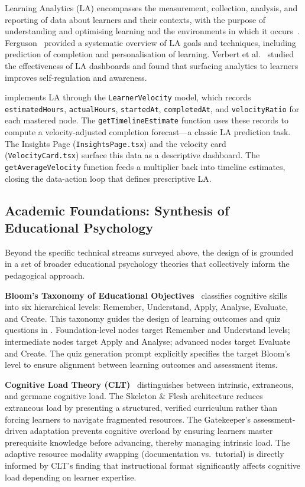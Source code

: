 Learning Analytics (LA) encompasses the measurement, collection, analysis, and reporting of data about learners and their contexts, with the purpose of understanding and optimising learning and the environments in which it occurs~\cite{siemens2011}. Ferguson~\cite{ferguson2012} provided a systematic overview of LA goals and techniques, including prediction of completion and personalisation of learning. Verbert et al.~\cite{verbert2012} studied the effectiveness of LA dashboards and found that surfacing analytics to learners improves self-regulation and awareness.

\projectname{} implements LA through the \texttt{LearnerVelocity} model, which records \texttt{estimatedHours}, \texttt{actualHours}, \texttt{startedAt}, \texttt{completedAt}, and \texttt{velocityRatio} for each mastered node. The \texttt{getTimelineEstimate} function uses these records to compute a velocity-adjusted completion forecast---a classic LA prediction task. The Insights Page (\texttt{InsightsPage.tsx}) and the velocity card (\texttt{VelocityCard.tsx}) surface this data as a descriptive dashboard. The \texttt{getAverageVelocity} function feeds a multiplier back into timeline estimates, closing the data-action loop that defines prescriptive LA.

\subsection{Academic Foundations: Synthesis of Educational Psychology}
\label{sec:academic-foundations}

Beyond the specific technical streams surveyed above, the design of \projectname{} is grounded in a set of broader educational psychology theories that collectively inform the pedagogical approach.

\textbf{Bloom's Taxonomy of Educational Objectives}~\cite{bloom1956} classifies cognitive skills into six hierarchical levels: Remember, Understand, Apply, Analyse, Evaluate, and Create. This taxonomy guides the design of learning outcomes and quiz questions in \projectname. Foundation-level nodes target Remember and Understand levels; intermediate nodes target Apply and Analyse; advanced nodes target Evaluate and Create. The quiz generation prompt explicitly specifies the target Bloom's level to ensure alignment between learning outcomes and assessment items.

\textbf{Cognitive Load Theory (CLT)}~\cite{sweller1988} distinguishes between intrinsic, extraneous, and germane cognitive load. The Skeleton \& Flesh architecture reduces extraneous load by presenting a structured, verified curriculum rather than forcing learners to navigate fragmented resources. The Gatekeeper's assessment-driven adaptation prevents cognitive overload by ensuring learners master prerequisite knowledge before advancing, thereby managing intrinsic load. The adaptive resource modality swapping (documentation vs.\ tutorial) is directly informed by CLT's finding that instructional format significantly affects cognitive load depending on learner expertise.

